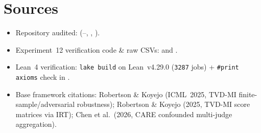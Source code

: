 \documentclass[11pt]{article}
\begin{document}
\section*{Sources}
\begin{itemize}[leftmargin=*,itemsep=2pt]
\item Repository audited:  (--, , ).
\item Experiment~12 verification code \& raw CSVs:  and .
\item Lean~4 verification: \texttt{lake build} on Lean~v4.29.0 (\texttt{3287} jobs) + \texttt{\#print axioms} check in .
\item Base framework citations: Robertson \& Koyejo (ICML~2025, TVD-MI finite-sample/adversarial robustness); Robertson \& Koyejo (2025, TVD-MI score matrices via IRT); Chen et al.\ (2026, CARE confounded multi-judge aggregation).
\end{itemize}
\end{document}
